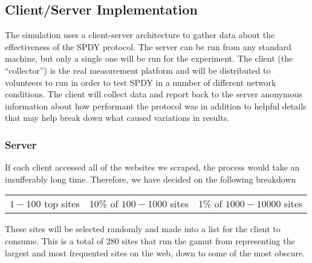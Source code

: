 \documentclass[11pt,letterpaper,notitlepage]{article}
\begin{document}
\subsection{Client/Server Implementation}
\label{sec:research/client-server}
The simulation uses a client-server architecture to gather data about the
effectiveness of the SPDY protocol. The server can be run from any standard
machine, but only a single one will be run for the experiment.  The client (the
``collector'') is the real measurement platform and will be distributed to
volunteers to run in order to test SPDY in a number of different network
conditions.  The client will collect data and report back to the server
anonymous information about how performant the protocol was in addition to
helpful details that may help break down what caused variations in results.
\subsubsection{Server}
\label{sec:research/server}
If each client accessed all of the websites we scraped, the process would take
an insufferably long time.  Therefore, we have decided on the following
breakdown
\begin{center}
\begin{tabular}{ccc}
$1-100$ top sites & 10\% of $100-1000$ sites & 1\% of $1000-10000$ sites \\
\end{tabular}
\end{center}

These sites will be selected randomly and made into a list for the client to
consume. This is a total of 280 sites that run the gamut from representing the
largest and most frequented sites on the web, down to some of the most obscure.
\end{document}

